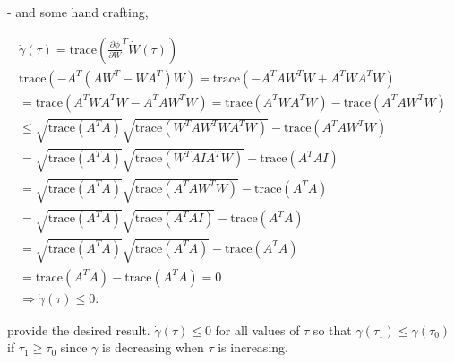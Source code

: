 - and some hand crafting, 


\begin{align*}
\dot{\gamma}(\tau)=\text{trace}(\frac{\partial \phi}{\partial W}^{T} \dot{W}(\tau))\\
    \text{trace}(-A^{T}(AW^{T} -WA^{T})W) = \text{trace}(-A^{T}AW^{T}W+A^{T}WA^{T}W)\\
    = \text{trace}(A^{T}WA^{T}W-A^{T}AW^{T}W) 
    = \text{trace}(A^{T}WA^{T}W) -\text{trace}(A^{T}AW^{T}W)\\
    \leq \sqrt{\text{trace}(A^{T}A)} \sqrt{\text{trace}(W^{T}AW^{T}WA^{T}W)} -\text{trace}(A^{T}AW^{T}W)\\
    = \sqrt{\text{trace}(A^{T}A)} \sqrt{\text{trace}(W^{T}AIA^{T}W)} -\text{trace}(A^{T}AI)\\
    = \sqrt{\text{trace}(A^{T}A)} \sqrt{\text{trace}(A^{T}AW^{T}W)} -\text{trace}(A^{T}A)\\
    = \sqrt{\text{trace}(A^{T}A)} \sqrt{\text{trace}(A^{T}AI)} -\text{trace}(A^{T}A)\\
    = \sqrt{\text{trace}(A^{T}A)} \sqrt{\text{trace}(A^{T}A)} -\text{trace}(A^{T}A)\\
    = \text{trace}(A^{T}A) -\text{trace}(A^{T}A)=0 \\ 
    \Longrightarrow \dot{\gamma}(\tau) \leq 0.
\end{align*}
 
 provide the desired result. $\dot{\gamma}(\tau)\leq 0$ for all values of $\tau$ so that $\gamma(\tau_1) \leq \gamma(\tau_0)$ if $\tau_1 \geq \tau_0$ since $\gamma$ is decreasing when $\tau$ is increasing.
 
